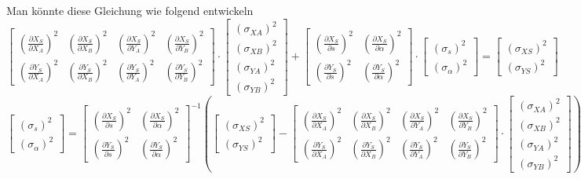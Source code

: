 \documentclass[12pt]{article}
\begin{document}
Man könnte diese Gleichung wie folgend entwickeln
\begin{equation*}
\begin{bmatrix}
(\frac{\partial X_S}{\partial X_A})^2 & (\frac{\partial X_S}{\partial X_B})^2 & (\frac{\partial X_S}{\partial Y_A})^2 & (\frac{\partial X_S}{\partial Y_B})^2\\
(\frac{\partial Y_S}{\partial X_A})^2 & (\frac{\partial Y_S}{\partial X_B})^2 & (\frac{\partial Y_S}{\partial Y_A})^2 & (\frac{\partial Y_S}{\partial Y_B})^2
\end{bmatrix} \cdot 
\begin{bmatrix}
(\sigma_{XA})^2 \\ (\sigma_{XB})^2 \\ (\sigma_{YA})^2 \\ (\sigma_{YB})^2 
\end{bmatrix} + 
\begin{bmatrix}
(\frac{\partial X_S}{\partial s})^2   & (\frac{\partial X_S}{\partial \alpha})^2\\
(\frac{\partial Y_S}{\partial s})^2   & (\frac{\partial Y_S}{\partial \alpha})^2
\end{bmatrix} \cdot
\begin{bmatrix}
(\sigma_s)^2 \\ (\sigma_{\alpha})^2 
\end{bmatrix} = 
\begin{bmatrix}
(\sigma_{XS})^2 \\ (\sigma_{YS})^2
\end{bmatrix}
\end{equation*}
\begin{equation*}
\begin{bmatrix}
(\sigma_s)^2 \\ (\sigma_{\alpha})^2 
\end{bmatrix} = 
\begin{bmatrix}
(\frac{\partial X_S}{\partial s})^2   & (\frac{\partial X_S}{\partial \alpha})^2\\
(\frac{\partial Y_S}{\partial s})^2   & (\frac{\partial Y_S}{\partial \alpha})^2
\end{bmatrix}^{-1}
\left(
\begin{bmatrix}
(\sigma_{XS})^2 \\ (\sigma_{YS})^2
\end{bmatrix} - 
\begin{bmatrix}
(\frac{\partial X_S}{\partial X_A})^2 & (\frac{\partial X_S}{\partial X_B})^2 & (\frac{\partial X_S}{\partial Y_A})^2 & (\frac{\partial X_S}{\partial Y_B})^2\\
(\frac{\partial Y_S}{\partial X_A})^2 & (\frac{\partial Y_S}{\partial X_B})^2 & (\frac{\partial Y_S}{\partial Y_A})^2 & (\frac{\partial Y_S}{\partial Y_B})^2
\end{bmatrix} \cdot 
\begin{bmatrix}
(\sigma_{XA})^2 \\ (\sigma_{XB})^2 \\ (\sigma_{YA})^2 \\ (\sigma_{YB})^2 
\end{bmatrix}
\right)
\end{equation*}
\end{document}
